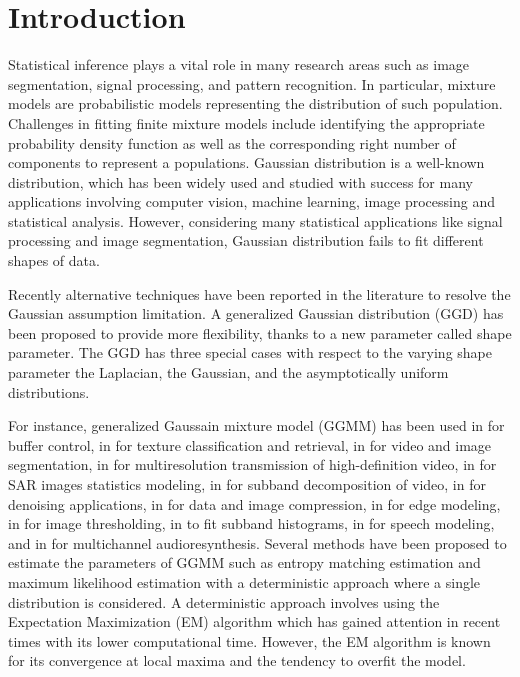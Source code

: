 \documentclass[conference]{IEEEtran}
\begin{document}

\section{Introduction}
Statistical inference plays a vital role in many research areas such as image segmentation, signal processing, and pattern recognition. In particular, mixture models are probabilistic models representing the distribution of such population. Challenges in fitting finite mixture models include identifying the appropriate probability density function as well as the corresponding right number of components to represent a populations. 
Gaussian distribution is a well-known distribution,
which has been widely used and studied with success for many applications involving computer vision, machine learning, image processing and statistical analysis.
However, considering many statistical applications like signal processing and image segmentation, Gaussian distribution fails to fit different shapes of data.

Recently alternative techniques have been reported in the literature to resolve the Gaussian assumption limitation. 
A generalized Gaussian distribution (GGD) has been proposed
to provide more flexibility, thanks to a new parameter called shape parameter.  
The GGD has three special cases with respect to the varying shape parameter the Laplacian, the Gaussian, and the asymptotically uniform distributions. 

For instance, generalized Gaussain mixture model (GGMM) has been used in \cite{n15} for buffer control, in \cite{n16, n17, n18} for texture classification and retrieval, in \cite{n27, n28, n29} for video and image segmentation, in \cite{n13} for multiresolution transmission of high-definition video, in \cite{n30} for SAR images statistics modeling, in \cite{n14} for subband decomposition of video,   in \cite{n19} for denoising applications, in \cite{n20, n21} for data and image compression, in \cite{n22} for edge modeling, in \cite{n23, n24} for image thresholding, in \cite{n12, n4} to fit subband histograms, in \cite{n25, n26} for speech modeling,  and in \cite{n31} for multichannel audioresynthesis.
Several methods have been proposed to estimate the parameters of GGMM such as entropy matching estimation \cite{n34, n26} and maximum likelihood estimation \cite{n32, n16, n35, n36, n10} with a deterministic approach where a single distribution is considered. A deterministic approach involves using the Expectation Maximization (EM) algorithm which has gained attention in recent times with its lower computational time. However, the EM algorithm is known for its convergence at local maxima and the tendency to overfit the model.
\end{document}
